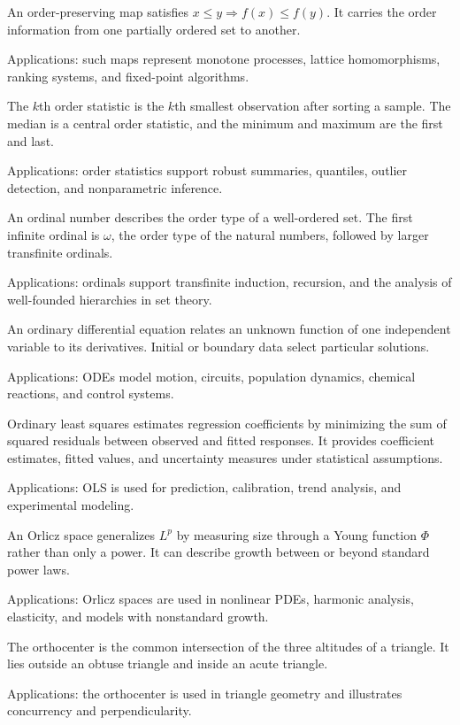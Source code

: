 An order-preserving map satisfies $x\leq y\Rightarrow f(x)\leq f(y)$. It carries the order information from one partially ordered set to another. \par\noindent Applications: such maps represent monotone processes, lattice homomorphisms, ranking systems, and fixed-point algorithms.

The $k$th order statistic is the $k$th smallest observation after sorting a sample. The median is a central order statistic, and the minimum and maximum are the first and last. \par\noindent Applications: order statistics support robust summaries, quantiles, outlier detection, and nonparametric inference.

An ordinal number describes the order type of a well-ordered set. The first infinite ordinal is $\omega$, the order type of the natural numbers, followed by larger transfinite ordinals. \par\noindent Applications: ordinals support transfinite induction, recursion, and the analysis of well-founded hierarchies in set theory.

An ordinary differential equation relates an unknown function of one independent variable to its derivatives. Initial or boundary data select particular solutions. \par\noindent Applications: ODEs model motion, circuits, population dynamics, chemical reactions, and control systems.

Ordinary least squares estimates regression coefficients by minimizing the sum of squared residuals between observed and fitted responses. It provides coefficient estimates, fitted values, and uncertainty measures under statistical assumptions. \par\noindent Applications: OLS is used for prediction, calibration, trend analysis, and experimental modeling.

An Orlicz space generalizes $L^p$ by measuring size through a Young function $\Phi$ rather than only a power. It can describe growth between or beyond standard power laws. \par\noindent Applications: Orlicz spaces are used in nonlinear PDEs, harmonic analysis, elasticity, and models with nonstandard growth.

The orthocenter is the common intersection of the three altitudes of a triangle. It lies outside an obtuse triangle and inside an acute triangle. \par\noindent Applications: the orthocenter is used in triangle geometry and illustrates concurrency and perpendicularity.

